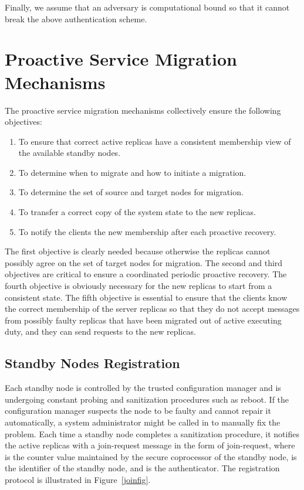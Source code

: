 \documentclass[times, 10pt, twocolumn]{article}
\begin{document}
Finally, we assume that an adversary is computational bound so that it cannot 
break the above authentication scheme. 

\section{Proactive Service Migration Mechanisms}

The proactive service migration mechanisms collectively ensure the
following objectives:
\begin{enumerate}
\item To ensure that correct active replicas have a consistent
membership view of the available standby nodes.

\item To determine when to migrate and how to initiate a migration.

\item To determine the set of source and target nodes for migration.

\item To transfer a correct copy of the system state to the new replicas.

\item To notify the clients the new membership after each proactive recovery.
\end{enumerate}
The first objective is clearly needed because otherwise the replicas
cannot possibly agree on the set of target nodes for migration. The
second and third objectives are critical to ensure a coordinated periodic 
proactive recovery. The fourth objective is obviously necessary for the new 
replicas to start from a consistent state. The fifth objective is essential to
ensure that the clients know the correct membership of the server replicas
so that they do not accept messages from possibly faulty replicas that
have been migrated out of active executing duty, and they can send
requests to the new replicas.

\subsection{Standby Nodes Registration}
Each standby node is controlled by the trusted configuration manager
and is undergoing constant probing and sanitization procedures such
as reboot. If the configuration manager suspects the node to be faulty
and cannot repair it automatically, a system administrator might be
called in to manually fix the problem. Each time a standby node completes
a sanitization procedure, it notifies the active replicas with a 
{\sc join-request} message in the form of 
{\sc join-request}, where  is the counter 
value maintained by the secure coprocessor of the standby node,  
is the identifier of the standby node, and  is the 
authenticator. The registration protocol is illustrated 
in Figure~\ref{joinfig}.
\end{document}
